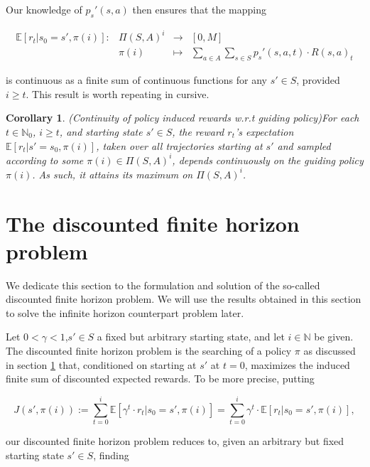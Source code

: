 \documentclass[11pt]{article} %
\newtheorem{cor}{Corollary}
\begin{document}
Our knowledge of $p_s'(s,a)$ then ensures that the mapping

\begin{equation}\label{contExpRewMap}
	\begin{array}{rccl}
		\mathbb{E}[r_t | s_0 = s', \pi(i)]: 	& \Pi(S,A)^i 	& \rightarrow 	& [0,M] \\
									& \pi(i)				 		& \mapsto 	& \sum_{a \in A} \sum_{s \in S} p_s'(s,a,t) \cdot R(s,a)_t
	\end{array}
\end{equation}

is continuous as a finite sum of continuous functions for any $s' \in S$, provided $i \ge t$. This result is worth repeating in cursive.

\begin{cor}{(Continuity of policy induced rewards w.r.t guiding policy)}\label{corContinuousReward}
For each $t \in \mathbb{N}_0$, $i \ge t$, and starting state $s' \in S$, the reward $r_t$'s expectation $\mathbb{E}[r_t | s' = s_0, \pi(i)]$, taken over all trajectories starting at $s'$ and sampled according to some $\pi(i) \in \Pi(S,A)^i$, depends continuously on the guiding policy $\pi(i)$. As such, it attains its maximum on $\Pi(S,A)^i$.
\end{cor}

\section{The discounted finite horizon problem}

We dedicate this section to the formulation and solution of the so-called discounted finite horizon problem. We will use the results obtained in this section to solve the infinite horizon counterpart problem later.

Let $0 < \gamma < 1$,$s' \in S$ a fixed but arbitrary starting state, and let $i \in \mathbb{N}$ be given. The discounted finite horizon problem is the searching of a policy $\pi$ as discussed in section \ref{} that, conditioned on starting at $s'$ at $t=0$, maximizes the induced finite sum of discounted expected rewards. To be more precise, putting

\begin{equation}\label{eqFinDiscHorReward}
		J(s',\pi(i)) := \sum_{t=0}^i \mathbb{E}[ \gamma^t \cdot r_t | s_0 = s', \pi(i)] = \sum_{t=0}^i \gamma^t \cdot \mathbb{E}[ r_t | s_0 = s', \pi(i)],
\end{equation}

our discounted finite horizon problem reduces to, given an arbitrary but fixed starting state $s' \in S$, finding
\end{document}
